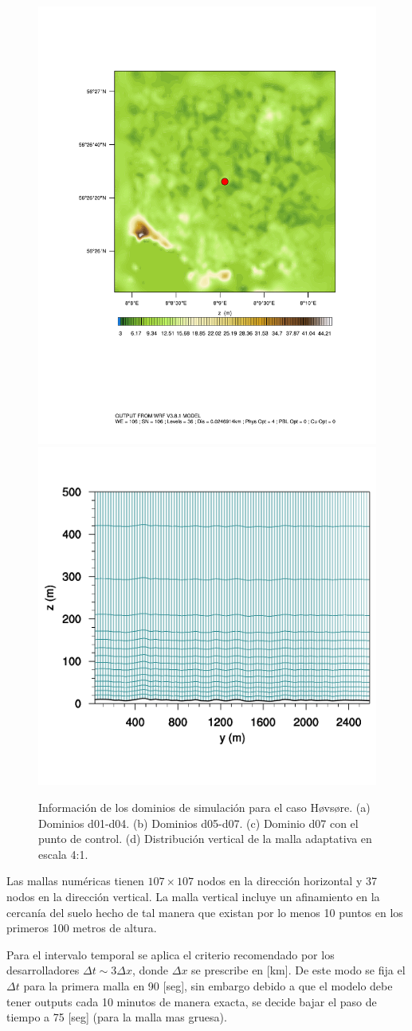 \begin{figure}[H]
	\includegraphics[width=0.45\linewidth,trim={2.5cm 6.5cm 2cm 3.5cm},clip]{Imagenes/05/hov_control_point.pdf}%
	\includegraphics[width=0.45\linewidth,trim={0.5cm 0cm 0cm -1.3cm},clip]{Imagenes/05/mesh57}%
	
	\caption{Información de los dominios de simulación para el caso Høvsøre. (a) Dominios d01-d04. (b) Dominios d05-d07. (c) Dominio d07 con el punto de control. (d) Distribución vertical de la malla adaptativa en escala 4:1.}
	\label{fig:05_dom_hov}
\end{figure}

Las mallas numéricas tienen $107\times107$ nodos en la dirección horizontal y 37 nodos en la dirección vertical. La malla vertical incluye un afinamiento en la cercanía del suelo hecho de tal manera que existan por lo menos 10 puntos en los primeros 100 metros de altura. 

Para el intervalo temporal se aplica el criterio recomendado por los desarrolladores $\Delta t \sim 3\Delta x$, donde $\Delta x$ se prescribe en [km]. De este modo se fija el $\Delta t$ para la primera malla en 90 [seg], sin embargo debido a que el modelo debe tener outputs cada 10 minutos de manera exacta, se decide bajar el paso de tiempo a 75 [seg] (para la malla mas gruesa).

